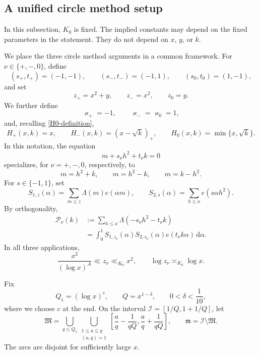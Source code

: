 \documentclass[12pt,reqno]{amsart}
\numberwithin{equation}{section}
\theoremstyle{plain}
\theoremstyle{remark}
\newcommand{\dif}{\mathrm{d}}
\newcommand{\majorarc}{\mathfrak{M}}
\newcommand{\minorarc}{\mathfrak{m}}
\begin{document}
\subsection{A unified circle method setup}

In this subsection, $K_0$ is fixed.  The implied constants may depend
on the fixed parameters in the statement.  They do not depend on $x$,
$y$, or $k$.


We place the three circle method arguments in a common framework.
For $\nu\in\{+,-,0\}$, define
\begin{equation*}\label{signed-data}
 (s_+,t_+)=(-1,-1),\qquad
 (s_-,t_-)=(-1,1),\qquad
 (s_0,t_0)=(1,-1),
\end{equation*}
and set
\begin{equation}\label{three-cutoffs}
 z_+=x^2+y,\qquad z_-=x^2,\qquad z_0=y.
\end{equation}
We further define
\[
 \varkappa_+=-1,\qquad
 \varkappa_-=\varkappa_0=1,
\]
and, recalling \eqref{H0-definition},
\[
 H_+(x,k)=x,\qquad
 H_-(x,k)=(x-\sqrt{k})_+,\qquad
 H_0(x,k)=\min\{x,\sqrt{k}\}.
\]
In this notation, the equation
\[
 m+s_\nu h^2+t_\nu k=0
\]
specializes, for $\nu=+,-,0$, respectively, to
\[
 m=h^2+k,\qquad
 m=h^2-k,\qquad
 m=k-h^2.
\]
For $s\in\{-1,1\}$, set
\[
 S_{1,z}(\alpha)=\sum_{m\leq z}\Lambda(m)e(\alpha m),
 \qquad
 S_{2,s}(\alpha)=\sum_{h\leq x}e(s\alpha h^2).
\]
By orthogonality,
\begin{equation*}\label{unified-fourier-identity}
\begin{aligned}
 \mathcal P_\nu(k)
 &:=\sum_{h\leq x}\Lambda(-s_\nu h^2-t_\nu k)\\
 &=\int_0^1 S_{1,z_\nu}(\alpha)S_{2,s_\nu}(\alpha)
   e(t_\nu k\alpha)\,\dif\alpha.
\end{aligned}
\end{equation*}
In all three applications,
\begin{equation}\label{z-range}
 \frac{x^2}{(\log x)^A}\ll z_\nu\ll_{K_0}x^2,
 \qquad \log z_\nu\asymp_{K_0}\log x.
\end{equation}

Fix
\begin{equation}\label{circle-parameters}
 Q_1=(\log x)^c,\qquad Q=x^{1-\delta},
 \qquad 0<\delta<\frac1{10},
\end{equation}
where we choose $c$ at the end.  On the interval
$\mathcal I=[1/Q,1+1/Q]$, let
\[
 \majorarc=\bigcup_{q\leq Q_1}
 \bigcup_{\substack{1\leq a\leq q\\(a,q)=1}}
 \left[\frac aq-\frac1{qQ},\frac aq+\frac1{qQ}\right],
 \qquad
 \minorarc=\mathcal I\setminus\majorarc.
\]
The arcs are disjoint for sufficiently large $x$.
\end{document}
